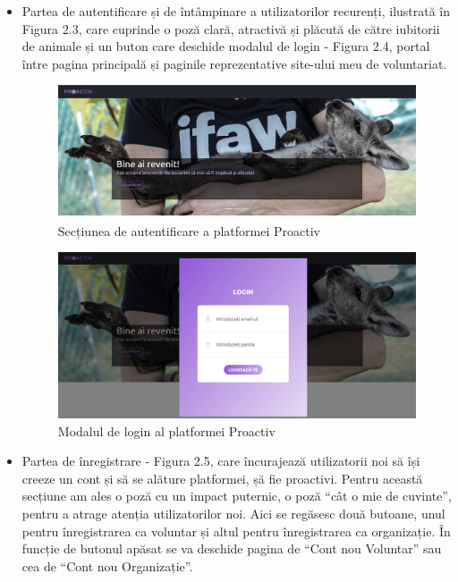 \documentclass[12pt,a4paper]{report}
\begin{document}
\begin{itemize}
  \item Partea de autentificare și de întâmpinare a utilizatorilor recurenți, ilustrată în Figura 2.3, care cuprinde o poză clară, atractivă și plăcută de către iubitorii de animale și un buton care deschide modalul de login - Figura 2.4, portal între pagina principală și paginile reprezentative site-ului meu de voluntariat.
\\
\begin{figure}[H]
\centering
  \includegraphics[width=1\linewidth]{./imagini/pp1.jpg}
  \caption{Secțiunea de autentificare a platformei Proactiv}
\end{figure}
\begin{figure}[H]
\centering
  \includegraphics[width=1\linewidth]{./imagini/login.jpg}
  \caption{Modalul de login al platformei Proactiv}
\end{figure}
\newpage
  \item Partea de înregistrare - Figura 2.5, care încurajează utilizatorii noi să își creeze un cont și să se alăture platformei, șă fie proactivi. Pentru această secțiune am ales o poză cu un impact puternic, o poză “cât o mie de cuvinte”, pentru a atrage atenția utilizatorilor noi. Aici se regăsesc două butoane, unul pentru înregistrarea ca voluntar și altul pentru înregistrarea ca organizație. În funcție de butonul apăsat se va deschide pagina de “Cont nou Voluntar” sau cea de “Cont nou Organizație”.

\end{itemize}
\end{document}
